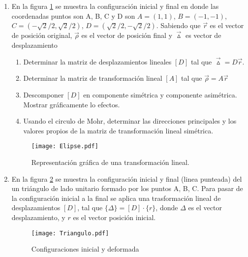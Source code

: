 \documentclass[../notas medios.tex]{subfiles}
\begin{document}
\begin{enumerate}

\item \label{ejer:trans_lineal} En la  figura \ref{fig:elipse} se muestra la 
configuración inicial y final en donde las coordenadas puntos son A, B, C y D 
son $A=(1,1)$, $B=(-1,-1)$, $C=(-\sqrt{2}/2,\sqrt{2}/2)$, 
$D=(\sqrt{2}/2,-\sqrt{2}/2)$. Sabiendo que $\vec{r}$ es el vector de posici\'on 
original, $\vec{\rho}$ es el vector de posición final y  $\vec{\vartriangle}$ 
es vector de desplazamiento 

\begin{enumerate}
\item Determinar la matriz de desplazamientos lineales $[D]$ tal que	
$\vec{\vartriangle}=  D  \vec{r}$. 
\item Determinar la matriz de transformación lineal $[A]$ tal que 
$\vec{\rho}= A  \vec{r}$	
\item Descomponer $[D]$ en componente simétrica y componente asimétrica. 
Mostrar gráficamente lo efectos. 	
\item  Usando el circulo de Mohr, determinar las direcciones principales y los 
valores propios de la matriz de transformación lineal simétrica.
\end{enumerate}

\begin{figure}[H]
    \centering	
    \texttt{[image: Elipse.pdf]}
    \caption{Representación gráfica de una transformación lineal.}
    \label{fig:elipse}
\end{figure}
	
\item  \label{punto02_d} En la figura \cref{Triangulo} se muestra la 
configuración inicial y final (linea punteada) del un triángulo de lado 
unitario formado por los puntos A, B, C. Para pasar de la configuración inicial 
a la final se aplica una trasformación lineal de desplazamientos $[D]$, tal que 
$\lbrace{\Delta}\rbrace = [D]\cdot\lbrace{r}\rbrace$, donde $\Delta$ es el 
vector desplazamiento, y $r$ es el vector posici\'on inicial.

\begin{figure}[H]
	\centering
	\texttt{[image: Triangulo.pdf]} 
	\caption{Configuraciones inicial y deformada}
	\label{Triangulo}
\end{figure}


\end{enumerate}
\end{document}
